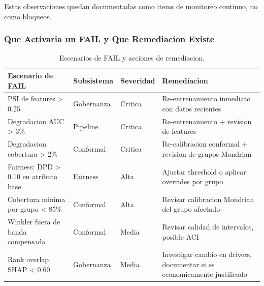 \documentclass[
  spanish,
  11pt,
  letterpaper,
]{scrbook}
\theoremstyle{plain}
\theoremstyle{remark}
\begin{document}
Estas observaciones quedan documentadas como items de monitoreo
continuo, no como bloqueos.

\subsubsection{Que Activaria un FAIL y Que Remediacion
Existe}\label{que-activaria-un-fail-y-que-remediacion-existe}

{

\begin{longtable}[]{@{}
  >{\raggedright\arraybackslash}p{}
  >{\raggedright\arraybackslash}p{}
  >{\raggedright\arraybackslash}p{}
  >{\raggedright\arraybackslash}p{}@{}}

\caption{\label{tbl-mrm-fail-scenarios}Escenarios de FAIL y acciones de
remediacion.}

\tabularnewline

\toprule\noalign{}
\begin{minipage}[b]{\linewidth}\raggedright
Escenario de FAIL
\end{minipage} & \begin{minipage}[b]{\linewidth}\raggedright
Subsistema
\end{minipage} & \begin{minipage}[b]{\linewidth}\raggedright
Severidad
\end{minipage} & \begin{minipage}[b]{\linewidth}\raggedright
Remediacion
\end{minipage} \\
\midrule\noalign{}
\endhead
\bottomrule\noalign{}
\endlastfoot
PSI de features \textgreater{} 0.25 & Gobernanza & Critica &
Re-entrenamiento inmediato con datos recientes \\
Degradacion AUC \textgreater{} 3\% & Pipeline & Critica &
Re-entrenamiento + revision de features \\
Degradacion cobertura \textgreater{} 2\% & Conformal & Critica &
Re-calibracion conformal + revision de grupos Mondrian \\
Fairness: DPD \textgreater{} 0.10 en atributo base & Fairness & Alta &
Ajustar threshold o aplicar overrides por grupo \\
Cobertura minima por grupo \textless{} 85\% & Conformal & Alta & Revisar
calibracion Mondrian del grupo afectado \\
Winkler fuera de banda compensada & Conformal & Media & Revisar calidad
de intervalos, posible ACI \\
Rank overlap SHAP \textless{} 0.60 & Gobernanza & Media & Investigar
cambio en drivers, documentar si es economicamente justificado \\

\end{longtable}

}
\end{document}
